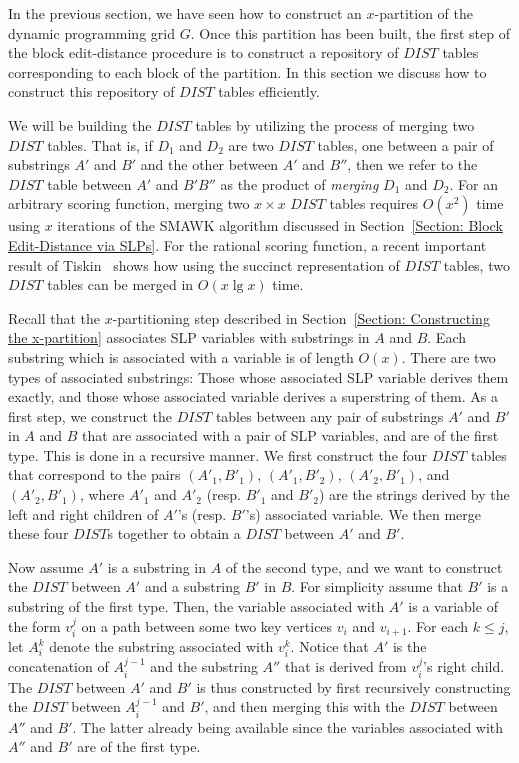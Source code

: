 

In the previous section, we have
seen how to construct an $x$-partition of the
dynamic programming grid $G$. Once this partition has been
built, the first step of the block edit-distance procedure is
to construct a repository of $DIST$ tables corresponding to
each block of the partition. In this section we discuss how to
construct this repository of $DIST$ tables efficiently.

We will be building the $DIST$ tables by utilizing the process
of merging two $DIST$ tables. That is, if $D_1$ and $D_2$ are
two $DIST$ tables, one between a pair of substrings $A'$ and
$B'$ and the other between $A'$ and $B''$, then we refer to the
$DIST$ table between $A'$ and $B'B''$ as the product of
\emph{merging} $D_1$ and $D_2$. For an arbitrary scoring
function, merging two $x\times x$ $DIST$ tables requires $O(x^2)$
time using $x$ iterations of the SMAWK algorithm discussed in
Section~\ref{Section: Block Edit-Distance via SLPs}. For the
rational scoring function, a recent important result of
Tiskin~\cite{Tiskin2009} shows how using the succinct
representation of $DIST$ tables, two $DIST$ tables can be
merged in $O(x \lg x)$ time.

Recall that the $x$-partitioning step described in
Section~\ref{Section: Constructing the x-partition}
associates SLP variables with substrings in $A$ and $B$. Each
substring which is associated with a variable is of length
$O(x)$. There are two types of associated substrings: Those
whose associated SLP variable derives them exactly, and those
whose associated variable derives a superstring of them. As a first step, we construct the
$DIST$ tables between any pair of substrings $A'$ and $B'$ in
$A$ and $B$ that are associated with a pair of SLP variables,
and are of the first type.
This is done in a recursive manner. We first construct
the  four $DIST$ tables that correspond to
the pairs $(A'_1,B'_1)$, $(A'_1,B'_2)$, $(A'_2,B'_1)$, and
$(A'_2,B'_1)$, where $A'_1$ and $A'_2$ (resp. $B'_1$ and $B'_2$) are the strings derived by the left and right
children of $A'$'s (resp. $B'$'s) associated variable.
We then merge these four $DIST$s together
to obtain a $DIST$ between $A'$ and $B'$.


Now assume $A'$ is a substring in $A$ of the second type, and
we want to construct the $DIST$ between $A'$ and a substring
$B'$ in $B$. For simplicity assume that $B'$ is a substring of
the first type. Then, the variable associated with $A'$ is a
variable of the form $v^j_i$ on a path between some two key
vertices $v_i$ and $v_{i+1}$.
For each $k \leq j$,
let $A^k_i$ denote the substring associated with  $v^k_i$. Notice that $A'$ is the concatenation of $A^{j-1}_i$ and the substring $A''$ that is derived from $v^j_i$'s right child.
The $DIST$
between $A'$ and $B'$ is thus constructed by first recursively
constructing the $DIST$ between $A^{j-1}_i$ and $B'$,
and then merging this with the $DIST$ between $A''$ and $B'$.
The latter already being available since the variables associated with $A''$ and $B'$ are of the first type.









